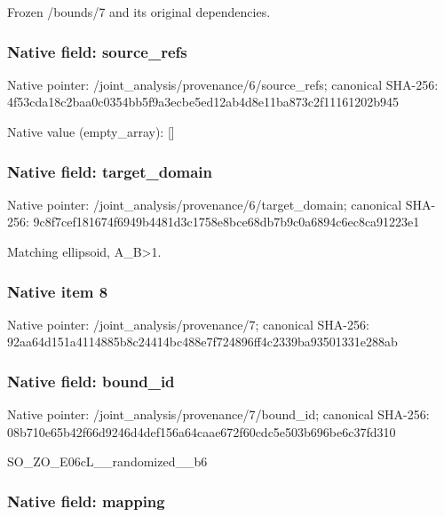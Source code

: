\documentclass[10pt,a4paper]{article}
\begin{document}
Frozen /bounds/7 and its original dependencies.


\subsubsection{Native field: source\_refs}


Native pointer: /joint\_analysis/provenan\allowbreak{}ce/6/source\_refs; canonical SHA-256: 4f53cda18c2baa0c0354bb5f\allowbreak{}9a3ecbe5ed12ab4d8e11ba87\allowbreak{}3c2f11161202b945



Native value (empty\_array): []



\subsubsection{Native field: target\_domain}


Native pointer: /joint\_analysis/provenan\allowbreak{}ce/6/target\_domain; canonical SHA-256: 9c8f7cef181674f6949b4481\allowbreak{}d3c1758e8bce68db7b9c0a68\allowbreak{}94c6ec8ca91223e1


Matching ellipsoid, A\_B>1.


\subsubsection{Native item 8}


Native pointer: /joint\_analysis/provenance/7; canonical SHA-256: 92aa64d151a4114885b8c244\allowbreak{}14bc488e7f724896ff4c2339\allowbreak{}ba93501331e288ab



\subsubsection{Native field: bound\_id}


Native pointer: /joint\_analysis/provenance/7/bound\_id; canonical SHA-256: 08b710e65b42f66d9246d4de\allowbreak{}f156a64caae672f60cdc5e50\allowbreak{}3b696be6c37fd310


SO\_ZO\_E06cL\_\_randomized\_\_b6


\subsubsection{Native field: mapping}
\end{document}
